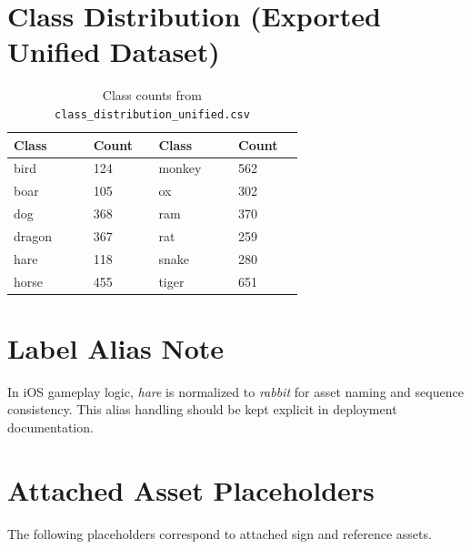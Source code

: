 \section{Class Distribution (Exported Unified Dataset)}
\begin{table}[H]
\centering
\caption{Class counts from \texttt{class\_distribution\_unified.csv}}
\label{tab:class_distribution}
\begin{tabular}{p{0.22\linewidth}p{0.18\linewidth}p{0.22\linewidth}p{0.18\linewidth}}
\toprule
Class & Count & Class & Count \\
\midrule
bird & 124 & monkey & 562 \\
boar & 105 & ox & 302 \\
dog & 368 & ram & 370 \\
dragon & 367 & rat & 259 \\
hare & 118 & snake & 280 \\
horse & 455 & tiger & 651 \\
\bottomrule
\end{tabular}
\end{table}

\section{Label Alias Note}
In iOS gameplay logic, \textit{hare} is normalized to \textit{rabbit} for asset naming and sequence consistency. This alias handling should be kept explicit in deployment documentation.

\section{Attached Asset Placeholders}
The following placeholders correspond to attached sign and reference assets.

